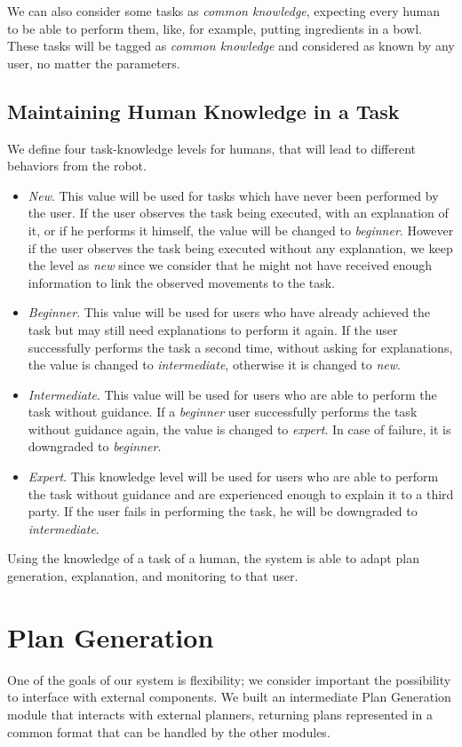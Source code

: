 We can also consider some tasks as \textit{common knowledge}, expecting every human to be able to perform them, like, for example, putting ingredients in a bowl. These tasks will be tagged as \textit{common knowledge} and considered as known by any user, no matter the parameters. 

\subsection{Maintaining Human Knowledge in a Task}
We define four task-knowledge levels for humans, that will lead to different behaviors from the robot.

\begin{itemize}
\item \textit{New}. This value will be used for tasks which have never been performed by the user. If the user observes the task being executed, with an explanation of it, or if he performs it himself, the value will be changed to \textit{beginner}. However if the user observes the task being executed without any explanation, we keep the level as \textit{new} since we consider that he might not have received enough information to link the observed movements to the task.
\item \textit{Beginner}. This value will be used for users who have already achieved the task but may still need explanations to perform it again. If the user successfully performs the task a second time, without asking for explanations, the value is changed to \textit{intermediate}, otherwise it is changed to \textit{new}.
\item \textit{Intermediate}. This value will be used for users who are able to perform the task without guidance. If a \textit{beginner} user successfully performs the task without guidance again, the value is changed to \textit{expert}. In case of failure, it is downgraded to \textit{beginner}.
\item \textit{Expert}. This knowledge level will be used for users who are able to perform the task without guidance and are experienced enough to explain it to a third party. If the user fails in performing the task, he will be downgraded to \textit{intermediate}.
\end{itemize}

Using the knowledge of a task of a human, the system is able to adapt plan generation, explanation, and monitoring to that user.

\section{Plan Generation}
\label{sec:plan_management-plan_generation}
One of the goals of our system is flexibility; we consider important the possibility to interface with external components. We built an intermediate Plan Generation module that interacts with external planners,  returning  plans represented in a common format that can be handled by the other modules. 

